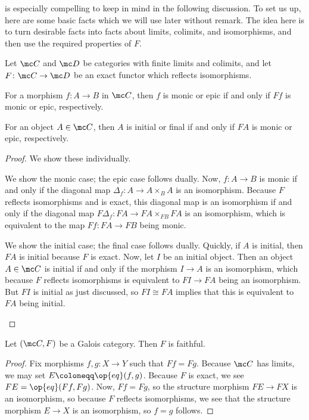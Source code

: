 \documentclass{amsart}
\begin{document}
 is especially compelling to keep in mind in the following discussion. To set us up, here are some basic facts which we will use later without remark. The idea here is to turn desirable facts into facts about limits, colimits, and isomorphisms, and then use the required properties of $F$.
\begin{lemma} \label{lem:dual-facts}
    Let $\mc C$ and $\mc D$ be categories with finite limits and colimits, and let $F\colon\mc C\to\mc D$ be an exact functor which reflects isomorphisms.
    \begin{listalph}
        \item For a morphism $f\colon A\to B$ in $\mc C$, then $f$ is monic or epic if and only if $Ff$ is monic or epic, respectively.
        \item For an object $A\in\mc C$, then $A$ is initial or final if and only if $FA$ is monic or epic, respectively.
    \end{listalph}
\end{lemma}
\begin{proof}
    We show these individually.
    \begin{listalph}
        \item We show the monic case; the epic case follows dually. Now, $f\colon A\to B$ is monic if and only if the diagonal map $\Delta_f\colon A\to A\times_BA$ is an isomorphism. Because $F$ reflects isomorphisms and is exact, this diagonal map is an isomorphism if and only if the diagonal map $F\Delta_f\colon FA\to FA\times_{FB}FA$ is an isomorphism, which is equivalent to the map $Ff\colon FA\to FB$ being monic.
        \item We show the initial case; the final case follows dually. Quickly, if $A$ is initial, then $FA$ is initial because $F$ is exact. Now, let $I$ be an initial object. Then an object $A\in\mc C$ is initial if and only if the morphism $I\to A$ is an isomorphism, which because $F$ reflects isomorphisms is equivalent to $FI\to FA$ being an isomorphism. But $FI$ is initial as just discussed, so $FI\cong FA$ implies that this is equivalent to $FA$ being initial.
        \qedhere
    \end{listalph}
\end{proof}
\begin{lemma} \label{lem:faithful}
    Let $(\mc C,F)$ be a Galois category. Then $F$ is faithful.
\end{lemma}
\begin{proof}
    Fix morphisms $f,g\colon X\to Y$ such that $Ff=Fg$. Because $\mc C$ has limits, we may set $E\coloneqq\op{eq}(f,g)$. Because $F$ is exact, we see $FE=\op{eq}(Ff,Fg)$. Now, $Ff=Fg$, so the structure morphism $FE\to FX$ is an isomorphism, so because $F$ reflects isomorphisms, we see that the structure morphism $E\to X$ is an isomorphism, so $f=g$ follows.
\end{proof}
\end{document}
